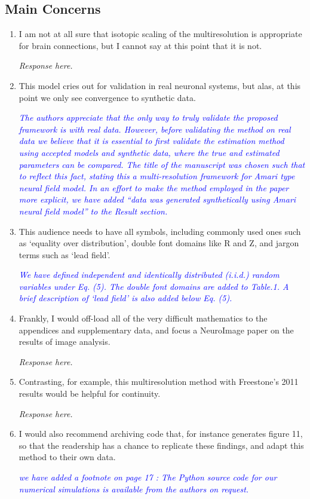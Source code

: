 \documentclass{article}
\newcommand{\parham}[1]{\textcolor{blue}{#1}}
\begin{document}
    \subsection{Main Concerns}
		\begin{enumerate} 
			\item I am not at all sure that isotopic scaling of the multiresolution is appropriate for brain connections, but I cannot say at this point that it is not.
			
			\emph{Response here.}
			 
			\item This model cries out for validation in real neuronal systems, but alas, at this point we only see convergence to synthetic data.   
			 
			 \emph{\parham{The authors appreciate that the only way to truly validate the proposed framework is with real data. However, before validating the method on real data we believe that it is essential to first validate the estimation method using accepted models and synthetic data, where the true and estimated parameters can be compared. The title of the manuscript was chosen such that to reflect this fact, stating this a multi-resolution framework for Amari type neural field model. In an effort to make the method employed in the paper more explicit, we have added ``data was generated synthetically using Amari neural field model'' to the Result section.}}  
			
			\item This audience needs to have all symbols, including commonly used ones such as `equality over distribution', double font domains like R and Z, and jargon terms such as `lead field'.
			
			\emph{\parham{ We have defined independent and identically distributed (i.i.d.) random variables under Eq. (5). The double font domains are added to Table.1. A brief description of `lead field' is also added below Eq. (5).}}  
			
			\item Frankly, I would off-load all of the very difficult mathematics to the appendices and supplementary data, and focus a NeuroImage paper on the results of image analysis. 
			
			\emph{Response here.}
			
			\item Contrasting, for example, this multiresolution method with Freestone's 2011 results would be helpful for continuity.
			
			\emph{Response here.}
			
			\item I would also recommend archiving code that, for instance generates figure 11, so that the readership has a chance to replicate these findings, and adapt this method to their own data.
			
 			\emph{\parham{we have added a footnote on page 17 : The Python source code for our numerical simulations is available from the authors on request.}}
 		
			                                       
			\end{enumerate}  
\end{document}

